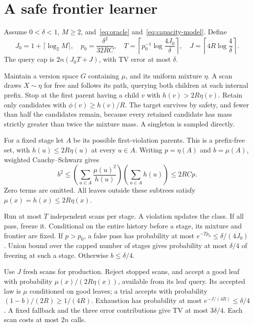 \documentclass[11pt]{article}
\theoremstyle{definition}\newtheorem{definition}[theorem]{Definition}
\theoremstyle{remark}\newtheorem{remark}[theorem]{Remark}
\begin{document}
\appendix
\section{A safe frontier learner}\label{app:frontier}
Assume $0<\delta<1$, $M\ge2$, and~\eqref{eq:oracle} and~\eqref{eq:capacity-model}. Define
\[
 J_0=1+\lceil\log_2M\rceil,\quad p_0=\frac{\delta^2}{32RC},\quad
 T=\left\lceil p_0^{-1}\log\frac{4J_0}{\delta}\right\rceil,\quad
 J=\left\lceil4R\log\frac4\delta\right\rceil.
\]
The query cap is $2n(J_0T+J)$, with TV error at most $\delta$.

Maintain a version space $G$ containing $\mu$, and its uniform mixture $\eta$. A scan draws $X\sim\eta$ for free and follows its path, querying both children at each internal prefix. Stop at the first parent having a child $v$ with $h(v)>2R\eta(v)$. Retain only candidates with $\phi(v)\ge h(v)/R$. The target survives by safety, and fewer than half the candidates remain, because every retained candidate has mass strictly greater than twice the mixture mass. A singleton is sampled directly.

For a fixed stage let $A$ be its possible first-violation parents. This is a prefix-free set, with $h(u)\le2R\eta(u)$ at every $u\in A$. Writing $p=\eta(A)$ and $b=\mu(A)$, weighted Cauchy--Schwarz gives
\[
 b^2\le\left(\sum_{u\in A}\frac{\mu(u)^2}{h(u)}\right)
           \left(\sum_{u\in A}h(u)\right)\le2RCp.
\]
Zero terms are omitted. All leaves outside these subtrees satisfy $\mu(x)=h(x)\le2R\eta(x)$.

Run at most $T$ independent scans per stage. A violation updates the class. If all pass, freeze it. Conditional on the entire history before a stage, its mixture and frontier are fixed. If $p>p_0$, a false pass has probability at most $e^{-Tp_0}\le\delta/(4J_0)$. Union bound over the capped number of stages gives probability at most $\delta/4$ of freezing at such a stage. Otherwise $b\le\delta/4$.

Use $J$ fresh scans for production. Reject stopped scans, and accept a good leaf with probability $\mu(x)/(2R\eta(x))$, available from its leaf query. Its accepted law is $\mu$ conditioned on good leaves; a trial accepts with probability $(1-b)/(2R)\ge1/(4R)$. Exhaustion has probability at most $e^{-J/(4R)}\le\delta/4$. A fixed fallback and the three error contributions give TV at most $3\delta/4$. Each scan costs at most $2n$ calls.
\end{document}
